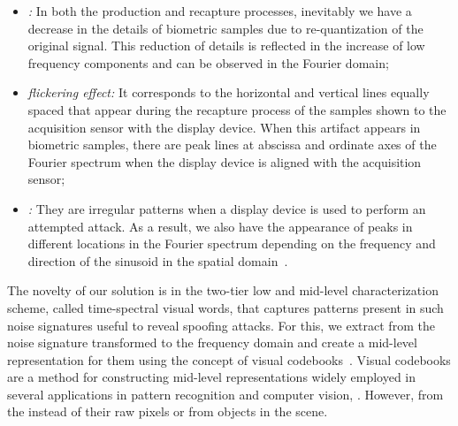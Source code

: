 %
\begin{itemize}
	\item \textit{:} In both the production and recapture processes, inevitably we have a decrease in the details of biometric samples due to re-quantization of the original signal. This reduction of details is reflected in the increase of low frequency components and can be observed in the Fourier domain;
	
	\item \textit{flickering effect:} It corresponds to the horizontal and vertical lines equally spaced that appear during the recapture process of the samples shown to the acquisition sensor with the display device. When this artifact appears in biometric samples, there are peak lines at abscissa and ordinate axes of the Fourier spectrum when the display device is aligned with the acquisition sensor;
	
	\item \textit{:} They are irregular patterns  when a display device is used to perform an attempted attack. As a result, we also have the appearance of peaks in different locations in the Fourier spectrum depending on the {frequency and direction of the sinusoid in the spatial domain}~\cite{Smith:SEG:1997}.
\end{itemize}

The novelty of our solution is in the two-tier low and mid-level characterization scheme, called time-spectral visual words, that captures patterns present in such noise signatures useful to reveal spoofing attacks. For this, we extract  from the noise signature transformed to the frequency domain and create a mid-level representation for them using the concept of visual codebooks~\cite{Sivic:ICCV:2003,Avila:ICIP:2011}. Visual codebooks are a method for constructing mid-level representations widely employed in several applications in pattern recognition and computer vision, . However,  from the  instead of their raw pixels or from objects in the scene. 

